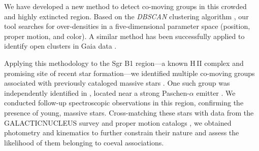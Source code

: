 \documentclass{aa} %
\begin{document}
	We have developed a new method to detect co-moving groups in this crowded and highly extincted region. Based on the \textit{DBSCAN} clustering algorithm \citep{dbscan}, our tool searches for over-densities in a five-dimensional parameter space (position, proper motion, and color). A similar method has been successfully applied to identify open clusters in Gaia data \citep{Castro2018}.
	
	Applying this methodology to the Sgr B1 region—a known H\,II complex and promising site of recent star formation—we identified multiple co-moving groups associated with previously cataloged massive stars \citep{Massive_stars}. One such group was independently identified in \cite{Ban_cluster}, located near a strong Paschen-$\alpha$ emitter \citep{HII_regions, Blue_SG}. We conducted follow-up spectroscopic observations in this region, confirming the presence of young, massive stars. Cross-matching these stars with data from the GALACTICNUCLEUS survey \citep{GNSI, GNSII} and proper motion catalogs \citep{LIBRALA2021}, we obtained photometry and kinematics to further constrain their nature and assess the likelihood of them belonging to coeval associations.
	
\end{document}
